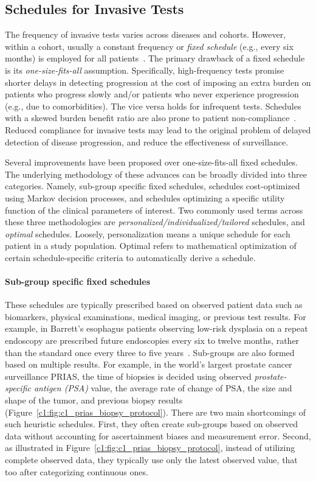 \subsection{Schedules for Invasive Tests}
\label{c1:subsec:scheduling_methodologies}
The frequency of invasive tests varies across diseases and cohorts. However, within a cohort, usually a constant frequency or \emph{fixed schedule} (e.g., every six months) is employed for all patients~\citep{henderson2011surveillance,bokhorst2015compliance,krist2007timing}. The primary drawback of a fixed schedule is its \emph{one-size-fits-all} assumption. Specifically, high-frequency tests promise shorter delays in detecting progression at the cost of imposing an extra burden on patients who progress slowly and/or patients who never experience progression (e.g., due to comorbidities). The vice versa holds for infrequent tests. Schedules with a skewed burden benefit ratio are also prone to patient non-compliance~\citep{bokhorst2015compliance,LeClercq2015325}. Reduced compliance for invasive tests may lead to the original problem of delayed detection of disease progression, and reduce the effectiveness of surveillance. 

Several improvements have been proposed over one-size-fits-all fixed schedules. The underlying methodology of these advances can be broadly divided into three categories. Namely, sub-group specific fixed schedules, schedules cost-optimized using Markov decision processes, and schedules optimizing a specific utility function of the clinical parameters of interest. Two commonly used terms across these three methodologies are \emph{personalized/individualized/tailored} schedules, and \emph{optimal} schedules. Loosely, personalization means a unique schedule for each patient in a study population. Optimal refers to mathematical optimization of certain schedule-specific criteria to automatically derive a schedule.

\paragraph{Sub-group specific fixed schedules}
These schedules are typically prescribed based on observed patient data such as biomarkers, physical examinations, medical imaging, or previous test results. For example, in Barrett's esophagus patients observing low-risk dysplasia on a repeat endoscopy are prescribed future endoscopies every six to twelve months, rather than the standard once every three to five years~\citep{choi2012screening}. Sub-groups are also formed based on multiple results. For example, in the world's largest prostate cancer surveillance PRIAS, the time of biopsies is decided using observed \emph{prostate-specific antigen (PSA)} value, the average rate of change of PSA, the size and shape of the tumor, and previous biopsy results (Figure~\ref{c1:fig:c1_prias_biopsy_protocol}). There are two main shortcomings of such heuristic schedules. First, they often create sub-groups based on observed data without accounting for ascertainment biases and measurement error. Second, as illustrated in Figure~\ref{c1:fig:c1_prias_biopsy_protocol}, instead of utilizing complete observed data, they typically use only the latest observed value, that too after categorizing continuous ones.

